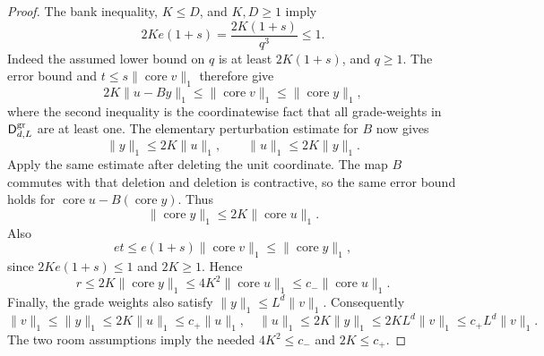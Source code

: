 \begin{proof}
The bank inequality, $K\le D$, and $K,D\ge1$ imply
\[
2Ke(1+s)=\frac{2K(1+s)}{q^3}\le1.
\]
Indeed the assumed lower bound on $q$ is at least $2K(1+s)$, and
$q\ge1$. The error bound and $t\le s\|\operatorname{core}v\|_1$
therefore give
\[
2K\|u-By\|_1\le\|\operatorname{core}v\|_1
 \le\|\operatorname{core}y\|_1,
\]
where the second inequality is the coordinatewise fact that all
grade-weights in $\mathsf D^{\rm gr}_{d,L}$ are at least one. The elementary
perturbation estimate for $B$ now gives
\[
\|y\|_1\le2K\|u\|_1,\qquad
\|u\|_1\le2K\|y\|_1.
\]
Apply the same estimate after deleting the unit coordinate. The map $B$
commutes with that deletion and deletion is contractive, so the same error
bound holds for $\operatorname{core}u-B(\operatorname{core}y)$. Thus
\[
\|\operatorname{core}y\|_1\le2K\|\operatorname{core}u\|_1.
\]
Also
\[
 et\le e(1+s)\|\operatorname{core}v\|_1
    \le \|\operatorname{core}y\|_1,
\]
since $2Ke(1+s)\le1$ and $2K\ge1$. Hence
\[
 r\le2K\|\operatorname{core}y\|_1
    \le4K^2\|\operatorname{core}u\|_1
    \le c_-\|\operatorname{core}u\|_1.
\]
Finally, the grade weights also satisfy
$\|y\|_1\le L^d\|v\|_1$. Consequently
\[
 \|v\|_1\le\|y\|_1\le2K\|u\|_1\le c_+\|u\|_1,
 \quad
 \|u\|_1\le2K\|y\|_1\le2KL^d\|v\|_1
                         \le c_+L^d\|v\|_1.
\]
The two room assumptions imply the needed $4K^2\le c_-$ and
$2K\le c_+$.
\end{proof}

